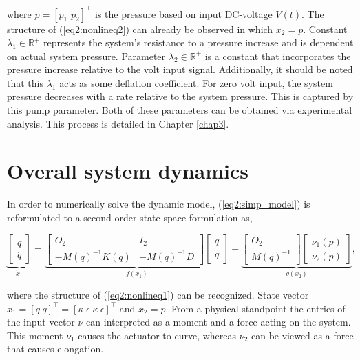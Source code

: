 where $p =  [p_1 \hspace{4pt} p_2]^\top$ is the pressure based on input DC-voltage $V(t)$. The structure of (\ref{eq2:nonlineq2}) can already be observed in which $x_2 = p$. Constant $\lambda_1 \in \mathbb{R}^+$ represents the system's resistance to a pressure increase and is dependent on actual system pressure. Parameter $\lambda_2 \in \mathbb{R}^+$ is a constant that incorporates the pressure increase relative to the volt input signal. Additionally, it should be noted that this $\lambda_1$ acts as some deflation coefficient. For zero volt input, the system pressure decreases with a rate relative to the system pressure. This is captured by this pump parameter. Both of these parameters can be obtained via experimental analysis. This process is detailed in Chapter \ref{chap3}.







\section{Overall system dynamics}


In order to numerically solve the dynamic model,  (\ref{eq2:simp_model}) is reformulated to a second order state-space formulation as,

\begin{equation}
    \underbrace{\begin{bmatrix}\dot{q}\\ \ddot{q}  \end{bmatrix}}_{\dot{x}_1}   = \underbrace{  \begin{bmatrix} O_{2} & I_{2} \\ -M(q)^{-1}K(q)  & -M(q)^{-1} D \end{bmatrix}   \begin{bmatrix} q \\ \dot{q} \end{bmatrix} }_{f(x_1)}  +      \underbrace{ \begin{bmatrix} O_{2} \\ M(q)^{-1}   \end{bmatrix}       \begin{bmatrix} \nu_1(p) \\ \nu_2(p)  
    \end{bmatrix} }_{g(x_2)}, 
    \label{eq4:SS}
\end{equation}

where the structure of (\ref{eq2:nonlineq1}) can be recognized. State vector $x_1 = [ q \hspace{3pt} \dot{q}   ]^\top =  [\kappa \hspace{3pt} \epsilon \hspace{3pt} \dot{\kappa}  \hspace{3pt} \dot{\epsilon}  ]^{\top}$ and $x_2 = p$. From a physical standpoint the entries of the input vector $\nu$ can interpreted as a moment and a force acting on the system. This moment $\nu_1$ causes the actuator to curve, whereas $\nu_2$ can be viewed as a force that causes elongation.



